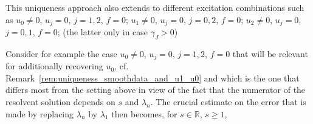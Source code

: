 \begin{remark}\label{rem:uniqueness_u0smooth}
This uniqueness approach also extends to different excitation combinations such as 
$u_0\not=0$, $u_j=0$, $j=1,2$, $f=0$; 
$u_1\not=0$, $u_j=0$, $j=0,2$, $f=0$; 
$u_2\not=0$, $u_j=0$, $j=0,1$, $f=0$; (the latter only in case $\gamma_J>0$) 

Consider for example the case $u_0\not=0$, $u_j=0$, $j=1,2$, $f=0$ that will be relevant for additionally recovering $u_0$, cf. Remark~\ref{rem:uniqueness_smoothdata_and_u1_u0} and which is the one that differs most from the setting above in view of the fact that the numerator of the resolvent solution depends on $s$ and $\lambda_n$.
The crucial estimate on the error that is made by replacing $\lambda_n$ by $\lambda_1$ then becomes, for $s\in\mathbb{R}$, $s\geq1$, 
\end{remark}
